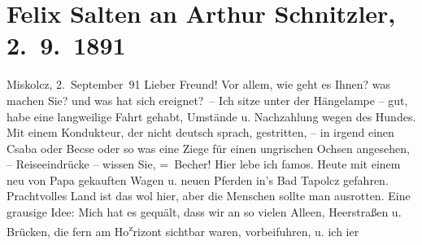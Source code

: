 

         
         \renewcommand{\erwaehntePersonen}{Personen: Bertha Karlsburg, Paula Makay, Felix Salten, Philipp Salzmann, Michael Emil Salzmann, Ignaz Salzmann, Theodor Salzmann, Geza Sós}
         \renewcommand{\erwaehnteInstitutionen}{Institutionen: Danzer’s Orpheum}
         \renewcommand{\erwaehnteOrte}{Orte: Miskolc, Miskolctapolca, Mödling, Ungarn, Wien}
         \renewcommand{\erwaehnteWerke}{}
               \section[Felix Salten an Arthur Schnitzler, 2. 9. 1891]{ Felix Salten an Arthur Schnitzler, 2. 9. 1891}\nopagebreak{}\rehead{ }\begin{ledgroupsized}[t]{13cm}\normalsize\beginnumbering \toendnotes[C]{\smallbreak\pagebreak[2]} 
\toendnotes[C]{\smallbreak}\pstart
           \raggedleft{}{\pb}Miskolcz, 2. September 91\pend
           \pstart
           Lieber Freund! Vor allem, wie geht es Ihnen? was
               machen Sie? und was hat sich ereignet? –\pend
           \pstart
           Ich sitze unter der Hängelampe – gut, habe eine langweilige Fahrt gehabt, Umstände u.
               Nachzahlung wegen des Hundes. Mit einem Kondukteur, der nicht deutsch sprach,
               gestritten, – in irgend einen Csaba oder Becse oder so was eine Ziege für einen
               ungrischen Ochsen angesehen, – Reiseeindrücke – wissen Sie, = Becher!\pend
           \pstart
           {\pb}Hier lebe ich famos. Heute mit einem neu von Papa gekauften Wagen u. neuen Pferden in’s
                  Bad Tapolcz gefahren. Prachtvolles Land ist das wol hier, aber
               die Menschen sollte man ausrotten.\pend
           \pstart
           Eine grausige Idee: Mich hat es gequält, dass wir an so vielen Alleen, Heerstraßen u.
               Brücken,  die fern am Ho\substVorne{}\textsuperscript{z}\substDazwischen{}r\substHinten{}izont sichtbar waren, vorbeifuhren, u. ich i{\geminationm}er

\end{ledgroupsized}
